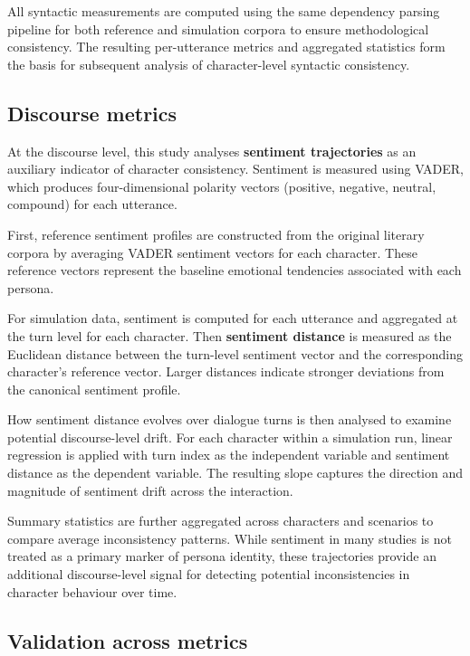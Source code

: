 \documentclass{article}
\begin{document}
All syntactic measurements are computed using the same dependency parsing pipeline for both reference and simulation corpora to ensure methodological consistency. The resulting per-utterance metrics and aggregated statistics form the basis for subsequent analysis of character-level syntactic consistency.


\subsection{Discourse metrics}

At the discourse level, this study analyses \textbf{sentiment trajectories} as an auxiliary indicator of character consistency. Sentiment is measured using VADER, which produces four-dimensional polarity vectors (positive, negative, neutral, compound) for each utterance.

First, reference sentiment profiles are constructed from the original literary corpora by averaging VADER sentiment vectors for each character. These reference vectors represent the baseline emotional tendencies associated with each persona.

For simulation data, sentiment is computed for each utterance and aggregated at the turn level for each character. Then \textbf{sentiment distance} is measured as the Euclidean distance between the turn-level sentiment vector and the corresponding character’s reference vector. Larger distances indicate stronger deviations from the canonical sentiment profile.

How sentiment distance evolves over dialogue turns is then analysed to examine potential discourse-level drift. For each character within a simulation run, linear regression is applied with turn index as the independent variable and sentiment distance as the dependent variable. The resulting slope captures the direction and magnitude of sentiment drift across the interaction.

Summary statistics are further aggregated across characters and scenarios to compare average inconsistency patterns. While sentiment in many studies is not treated as a primary marker of persona identity, these trajectories provide an additional discourse-level signal for detecting potential inconsistencies in character behaviour over time.

\subsection{Validation across metrics}
\end{document}
